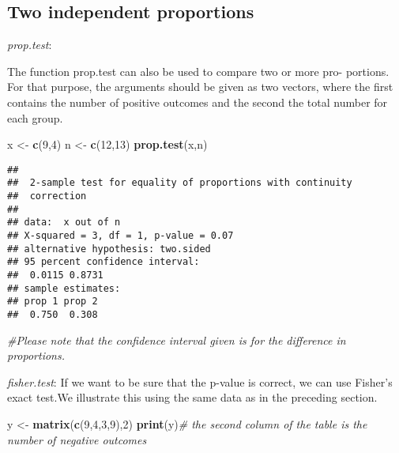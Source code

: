 \documentclass[]{book}
\newenvironment{Shaded}{\begin{snugshade}}{\end{snugshade}}
\newcommand{\KeywordTok}[1]{\textcolor[rgb]{0.13,0.29,0.53}{\textbf{#1}}}
\newcommand{\DecValTok}[1]{\textcolor[rgb]{0.00,0.00,0.81}{#1}}
\newcommand{\StringTok}[1]{\textcolor[rgb]{0.31,0.60,0.02}{#1}}
\newcommand{\CommentTok}[1]{\textcolor[rgb]{0.56,0.35,0.01}{\textit{#1}}}
\newcommand{\NormalTok}[1]{#1}
\theoremstyle{definition}
\theoremstyle{definition}
\theoremstyle{definition}
\theoremstyle{remark}
\begin{document}
\subsection{Two independent
proportions}\label{two-independent-proportions}

\emph{prop.test}:

The function prop.test can also be used to compare two or more pro-
portions. For that purpose, the arguments should be given as two
vectors, where the first contains the number of positive outcomes and
the second the total number for each group.

\begin{Shaded}
\begin{Highlighting}[]
\NormalTok{x <-}\StringTok{ }\KeywordTok{c}\NormalTok{(}\DecValTok{9}\NormalTok{,}\DecValTok{4}\NormalTok{)}
\NormalTok{n <-}\StringTok{ }\KeywordTok{c}\NormalTok{(}\DecValTok{12}\NormalTok{,}\DecValTok{13}\NormalTok{)}
\KeywordTok{prop.test}\NormalTok{(x,n)}
\end{Highlighting}
\end{Shaded}

\begin{verbatim}
## 
##  2-sample test for equality of proportions with continuity
##  correction
## 
## data:  x out of n
## X-squared = 3, df = 1, p-value = 0.07
## alternative hypothesis: two.sided
## 95 percent confidence interval:
##  0.0115 0.8731
## sample estimates:
## prop 1 prop 2 
##  0.750  0.308
\end{verbatim}

\begin{Shaded}
\begin{Highlighting}[]
\CommentTok{#Please note that the confidence interval given is for the difference in proportions.}
\end{Highlighting}
\end{Shaded}

\emph{fisher.test}: If we want to be sure that the p-value is correct,
we can use Fisher's exact test.We illustrate this using the same data as
in the preceding section.

\begin{Shaded}
\begin{Highlighting}[]
\NormalTok{y <-}\StringTok{ }\KeywordTok{matrix}\NormalTok{(}\KeywordTok{c}\NormalTok{(}\DecValTok{9}\NormalTok{,}\DecValTok{4}\NormalTok{,}\DecValTok{3}\NormalTok{,}\DecValTok{9}\NormalTok{),}\DecValTok{2}\NormalTok{)}
\KeywordTok{print}\NormalTok{(y)}\CommentTok{# the second column of the table is the number of negative outcomes}
\end{Highlighting}
\end{Shaded}
\end{document}
